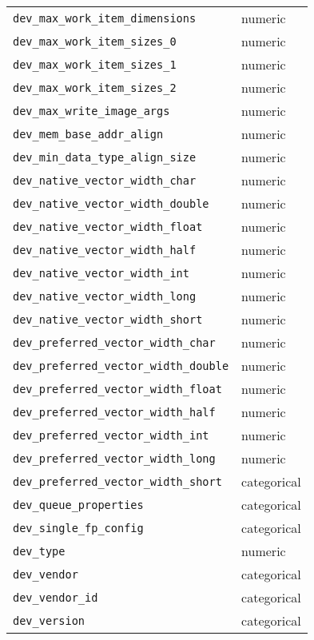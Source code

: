 \begin{tabular}{ll}
      \texttt{dev\_max\_work\_item\_dimensions} &      numeric \\
        \texttt{dev\_max\_work\_item\_sizes\_0} &      numeric \\
        \texttt{dev\_max\_work\_item\_sizes\_1} &      numeric \\
        \texttt{dev\_max\_work\_item\_sizes\_2} &      numeric \\
          \texttt{dev\_max\_write\_image\_args} &      numeric \\
           \texttt{dev\_mem\_base\_addr\_align} &      numeric \\
     \texttt{dev\_min\_data\_type\_align\_size} &      numeric \\
      \texttt{dev\_native\_vector\_width\_char} &      numeric \\
    \texttt{dev\_native\_vector\_width\_double} &      numeric \\
     \texttt{dev\_native\_vector\_width\_float} &      numeric \\
      \texttt{dev\_native\_vector\_width\_half} &      numeric \\
       \texttt{dev\_native\_vector\_width\_int} &      numeric \\
      \texttt{dev\_native\_vector\_width\_long} &      numeric \\
     \texttt{dev\_native\_vector\_width\_short} &      numeric \\
   \texttt{dev\_preferred\_vector\_width\_char} &      numeric \\
 \texttt{dev\_preferred\_vector\_width\_double} &      numeric \\
  \texttt{dev\_preferred\_vector\_width\_float} &      numeric \\
   \texttt{dev\_preferred\_vector\_width\_half} &      numeric \\
    \texttt{dev\_preferred\_vector\_width\_int} &      numeric \\
   \texttt{dev\_preferred\_vector\_width\_long} &      numeric \\
  \texttt{dev\_preferred\_vector\_width\_short} &  categorical \\
                \texttt{dev\_queue\_properties} &  categorical \\
               \texttt{dev\_single\_fp\_config} &  categorical \\
                             \texttt{dev\_type} &      numeric \\
                           \texttt{dev\_vendor} &  categorical \\
                       \texttt{dev\_vendor\_id} &  categorical \\
                          \texttt{dev\_version} &  categorical \\
\bottomrule
\end{tabular}

